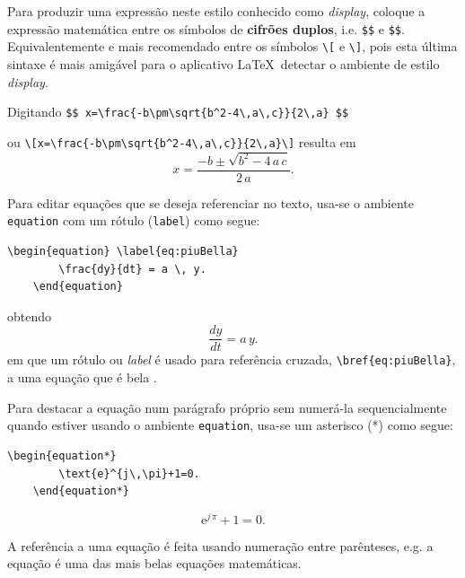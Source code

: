Para produzir uma  expressão neste estilo conhecido como \emph{display}, coloque a expressão matemática entre os símbolos de\textbf{ cifrões duplos}, i.e. \verb|$$| e \verb|$$|. Equivalentemente e mais recomendado entre os símbolos \verb|\[| e \verb|\]|, pois esta última sintaxe é mais amigável para o aplicativo \LaTeX\ detectar o ambiente de estilo \emph{display}. 

Digitando  \verb|$$ x=\frac{-b\pm\sqrt{b^2-4\,a\,c}}{2\,a} $$| 

ou  \verb|\[x=\frac{-b\pm\sqrt{b^2-4\,a\,c}}{2\,a}\]| resulta em  \[x=\frac{-b\pm\sqrt{b^2-4\,a\,c}}{2\,a}.\]

Para editar equações que se deseja referenciar no texto, usa-se o ambiente \texttt{equation} com um rótulo (\texttt{label}) como segue:

\begin{lstlisting}[language={[Latex]Tex},frame=single,numbers =none]
	\begin{equation} \label{eq:piuBella}
		\frac{dy}{dt} = a \, y.   
	\end{equation}
\end{lstlisting} 
obtendo 
	\begin{equation} \label{eq:piuBella}
	\frac{dy}{dt} = a \,  y.   
\end{equation}
em que um rótulo ou \emph{label} é usado para referência cruzada, \verb|\bref{eq:piuBella}|, a uma equação que é bela . 

Para destacar a equação num parágrafo próprio sem numerá-la sequencialmente quando estiver usando o ambiente \texttt{equation}, usa-se um asterisco (*) como segue:
\begin{lstlisting}[language={[Latex]Tex},frame=single,numbers =none]
	\begin{equation*}
		\text{e}^{j\,\pi}+1=0.
	\end{equation*}
\end{lstlisting}

\begin{equation*}
	\text{e}^{j\,\pi}+1=0.
\end{equation*}


A referência a uma equação é feita usando numeração entre parênteses, e.g. a equação  é uma das mais belas equações matemáticas.

